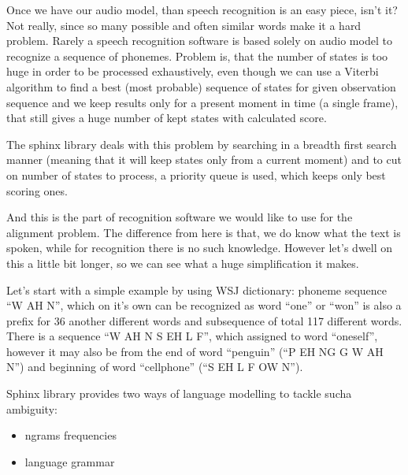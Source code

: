 \documentclass[12pt,a4paper,english]{article}
\begin{document}
\newpage

Once we have our audio model, than speech recognition is an easy piece, isn't it? \newline
Not really, since so many possible and often similar words make it a hard problem. Rarely a speech recognition software is based solely on audio model to recognize a sequence of phonemes. \newline
Problem is, that the number of states is too huge in order to be processed exhaustively, even though we can use a Viterbi algorithm to find a best (most probable) sequence of states for given observation sequence and we keep results only for a present moment in time (a single frame), that still gives a huge number
of kept states with calculated score. \newline

The sphinx library deals with this problem by searching in a breadth first search manner (meaning that it will keep states only from a current moment) and to cut on number of states to process, a priority queue is used, which keeps only best scoring ones. \newline

And this is the part of recognition software we would like to use for the alignment problem. \newline
The difference from here is that, we do know what the text is spoken, while for recognition there is no such knowledge. \newline
However let's dwell on this a little bit longer, so we can see what a huge simplification it makes. \newline

Let's start with a simple example by using WSJ dictionary: \newline
phoneme sequence “W AH N”, which  on it's own can be recognized as word “one” or “won” is also a prefix for 36 another different words and subsequence of total 117 different words. \newline
There is a sequence “W AH N S EH L F”, which assigned to word “oneself”, however it may also be from the end of word “penguin” (“P EH NG G W AH N”) and beginning of word “cellphone” (“S EH L F OW N”). \newline

Sphinx library provides two ways of language modelling to tackle sucha ambiguity:
\begin{itemize}
    \item ngrams frequencies
    \item language grammar
\end{itemize}
\end{document}
